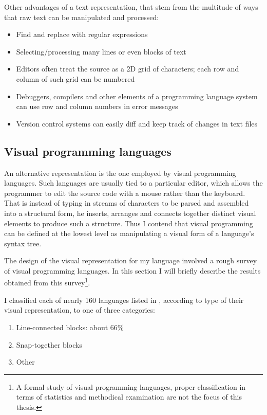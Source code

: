 Other advantages of a text representation, that stem from the multitude of ways
that raw text can be manipulated and processed:
\begin{itemize}
	\item Find and replace with regular expressions
	\item Selecting/processing many lines or even blocks of text
	\item Editors often treat the source as a 2D grid of characters; each
          row and column of such grid can be numbered
	\item Debuggers, compilers and other elements of a programming language
          system can use row and column numbers in error messages
	\item Version control systems can easily diff and keep track of changes
          in text files
\end{itemize}


\subsection{Visual programming languages}
An alternative representation is the one employed by visual programming
languages. Such languages are usually tied to a particular editor, which allows
the programmer to edit the source code with a mouse rather than the
keyboard. That is instead of typing in streams of characters to be parsed and
assembled into a structural form, he inserts, arranges and connects together
distinct visual elements to produce such a structure. Thus I contend that visual
programming can be defined at the lowest level as manipulating a visual form of
a language's syntax tree.

The design of the visual representation for my language involved a rough survey
of visual programming languages. In this section I will briefly describe the
results obtained from this survey\footnote{A formal study of visual programming
  languages, proper classification in terms of statistics and methodical
  examination are not the focus of this thesis.}.

I classified each of nearly 160 languages listed in \cite{snapshots}, according
to type of their visual representation, to one of three categories:
\begin{enumerate}
    \item Line-connected blocks: about 66\%
    \item Snap-together blocks
    \item Other
\end{enumerate}

